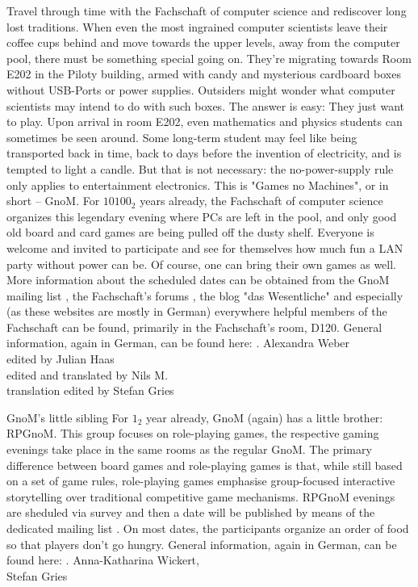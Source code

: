 {Travel through time with the Fachschaft of computer science and rediscover long lost traditions.
}{
    When even the most ingrained computer scientists leave their coffee cups behind and move towards the upper levels, away from the computer pool, there must be something special going on.
    They're migrating towards Room E202 in the Piloty building, armed with candy and mysterious cardboard boxes without USB-Ports or power supplies.
    Outsiders might wonder what computer scientists may intend to do with such boxes. The answer is easy: They just want to play.
    Upon arrival in room E202, even mathematics and physics students can sometimes be seen around.
    Some long-term student may feel like being transported back in time, back to days before the invention of electricity, and is tempted to light a candle.
    But that is not necessary: the no-power-supply rule only applies to entertainment electronics. This is "Games no Machines", or in short -- GnoM.
    For $10100_2$ years already, the Fachschaft of computer science organizes this legendary evening where PCs are left in the pool, and only good old board and card games are being pulled off the dusty shelf.
    Everyone is welcome and invited to participate and see for themselves how much fun a LAN party without power can be.
    Of course, one can bring their own games as well.
    More information about the scheduled dates can be obtained from the GnoM mailing list \footnotemark[1], the Fachschaft's forums \footnotemark[2], the blog "das Wesentliche" \footnotemark[3] and especially (as these websites are mostly in German) everywhere helpful members of the Fachschaft can be found, primarily in the Fachschaft's room, D120.
    General information, again in German, can be found here: \footnotemark[4].
}
{
    Alexandra Weber\\edited by Julian Haas\\edited and translated by Nils M.\\translation edited by Stefan Gries
}


{GnoM's little sibling}
{For $1_2$ year already, GnoM (again) has a little brother: RPGnoM.
    This group focuses on role-playing games, the respective gaming evenings take place in the same rooms as the regular GnoM.
    The primary difference between board games and role-playing games is that, while still based on a set of game rules, role-playing games emphasise group-focused interactive storytelling over traditional competitive game mechanisms.
    RPGnoM evenings are sheduled via survey and then a date will be published by means of the dedicated mailing list \footnotemark[5].
    On most dates, the participants organize an order of food so that players don't go hungry.
    General information, again in German, can be found here: \footnotemark[6].
}
{
    Anna-Katharina Wickert,\\Stefan Gries
}



